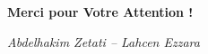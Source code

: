 \documentclass[serif, aspectratio=169]{beamer}
\begin{document}

\begin{frame}
	\begin{center}
		
		\Huge \textbf{Merci pour Votre Attention !}
		
		\vspace{1cm}
		
		\Large
		
		\textit{Abdelhakim Zetati -- Lahcen Ezzara} \\
		

	\end{center}
\end{frame}
\end{document}
